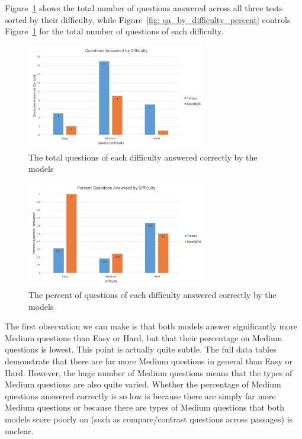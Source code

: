 \documentclass[pageno]{jpaper}
\begin{document}
Figure~\ref{fig: qa_by_difficulty} shows the total number of questions answered
across all three tests sorted by their difficulty, while Figure~\ref{fig:
qa_by_difficulty_percent} controls Figure~\ref{fig: qa_by_difficulty} for the
total number of questions of each difficulty.

\begin{figure}[!tb]
    \centering
    \includegraphics[width=0.7\textwidth,keepaspectratio]{figures/qa_by_difficulty.png}
    \caption{The total questions of each difficulty answered correctly by the models}
    \label{fig: qa_by_difficulty}
\end{figure}

\begin{figure}[!tb]
    \centering
    \includegraphics[width=0.7\textwidth,keepaspectratio]{figures/qa_by_difficulty_percent.png}
    \caption{The percent of questions of each difficulty answered correctly by the models}
    \label{fig: qa_by_difficulty_percent}
\end{figure}

The first observation we can make is that both models answer significantly more
Medium questions than Easy or Hard, but that their percentage on Medium
questions is lowest. This point is actually quite subtle. The full data tables
demonstrate that there are far more Medium questions in general than Easy or
Hard. However, the huge number of Medium questions means that the types of
Medium questions are also quite varied. Whether the percentage of Medium
questions answered correctly is so low is because there are simply far more
Medium questions or because there are types of Medium questions that both models
score poorly on (such as compare/contrast questions across passages) is unclear.
\end{document}
